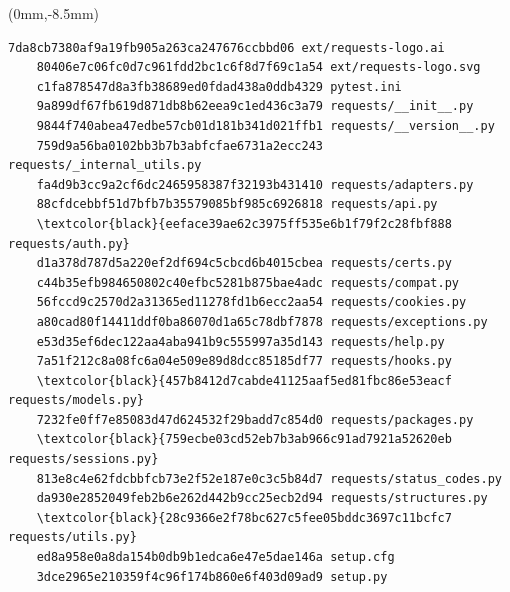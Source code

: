 \documentclass[aspectratio=169]{beamer}
\begin{document}
\begin{frame}[fragile]
    \begin{textblock*}{160mm}(0mm,-8.5mm)
    \begin{Verbatim}[formatcom=\color{grayish},commandchars=\\\{\}]
    7da8cb7380af9a19fb905a263ca247676ccbbd06 ext/requests-logo.ai
    80406e7c06fc0d7c961fdd2bc1c6f8d7f69c1a54 ext/requests-logo.svg
    c1fa878547d8a3fb38689ed0fdad438a0ddb4329 pytest.ini
    9a899df67fb619d871db8b62eea9c1ed436c3a79 requests/__init__.py
    9844f740abea47edbe57cb01d181b341d021ffb1 requests/__version__.py
    759d9a56ba0102bb3b7b3abfcfae6731a2ecc243 requests/_internal_utils.py
    fa4d9b3cc9a2cf6dc2465958387f32193b431410 requests/adapters.py
    88cfdcebbf51d7bfb7b35579085bf985c6926818 requests/api.py
    \textcolor{black}{eeface39ae62c3975ff535e6b1f79f2c28fbf888 requests/auth.py}
    d1a378d787d5a220ef2df694c5cbcd6b4015cbea requests/certs.py
    c44b35efb984650802c40efbc5281b875bae4adc requests/compat.py
    56fccd9c2570d2a31365ed11278fd1b6ecc2aa54 requests/cookies.py
    a80cad80f14411ddf0ba86070d1a65c78dbf7878 requests/exceptions.py
    e53d35ef6dec122aa4aba941b9c555997a35d143 requests/help.py
    7a51f212c8a08fc6a04e509e89d8dcc85185df77 requests/hooks.py
    \textcolor{black}{457b8412d7cabde41125aaf5ed81fbc86e53eacf requests/models.py}
    7232fe0ff7e85083d47d624532f29badd7c854d0 requests/packages.py
    \textcolor{black}{759ecbe03cd52eb7b3ab966c91ad7921a52620eb requests/sessions.py}
    813e8c4e62fdcbbfcb73e2f52e187e0c3c5b84d7 requests/status_codes.py
    da930e2852049feb2b6e262d442b9cc25ecb2d94 requests/structures.py
    \textcolor{black}{28c9366e2f78bc627c5fee05bddc3697c11bcfc7 requests/utils.py}
    ed8a958e0a8da154b0db9b1edca6e47e5dae146a setup.cfg
    3dce2965e210359f4c96f174b860e6f403d09ad9 setup.py
    \end{Verbatim}
    \end{textblock*}
\end{frame}
\end{document}
